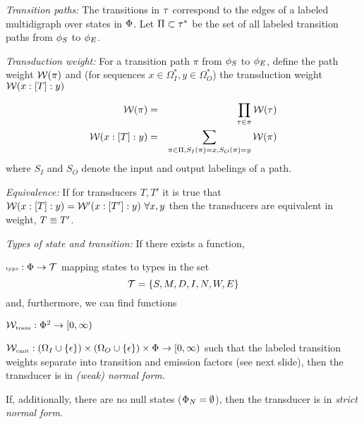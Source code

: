 \documentclass{beamer}
\begin{document}
\begin{frame}{}

{\em Transition paths:}
The transitions in $\tau$ correspond to the edges of a labeled multidigraph over states in $\Phi$.
Let $\Pi \subset \tau^\ast$ be the set of all labeled transition paths from $\phi_S$ to $\phi_E$.

{\em Transduction weight:}
For a transition path $\pi$ from $\phi_S$ to $\phi_E$,
define the path weight ${\cal W}(\pi)$ and
(for sequences $x \in \Omega_I^\ast, y \in \Omega_O^\ast$)
the transduction weight ${\cal W}(x : [T] : y)$

\begin{eqnarray*}
{\cal W}(\pi) & = & \prod_{\tau \in \pi} {\cal W}(\tau) \\
{\cal W}(x : [T] : y) & = & \sum_{\pi \in \Pi, S_I(\pi)=x, S_O(\pi)=y} {\cal W}(\pi)
\end{eqnarray*}
where $S_I$ and $S_O$ denote the input and output labelings of a path.
\end{frame}

\begin{frame}{}

{\em Equivalence:}
If for transducers $T,T'$ it is true that $\wtrans{\weight}{x}{T}{y}=\wtrans{\weight'}{x}{T'}{y}\ \forall x,y$ then the transducers are equivalent in weight, $T \equiv T'$.
\end{frame}

\begin{frame}{}

{\em Types of state and transition:}
If there exists a function,
\itemb
\item $\mbox{\tiny type}:\Phi \to {\cal T}$
\iteme
mapping states to types in the set
\[
{\cal T} = \{S,M,D,I,N,W,E\}
\]
and, furthermore, we can find functions
\itemb
\item ${\cal W}_{\mbox{\tiny trans}}: \Phi^2 \to [0,\infty)$
\item ${\cal W}_{\mbox{\tiny emit}}: (\Omega_{I} \cup \{\epsilon\}) \times (\Omega_{O} \cup \{\epsilon\}) \times \Phi \to [0,\infty)$
\iteme
such that the labeled transition weights separate into transition and emission factors (see next slide),
then the transducer is in {\em (weak) normal form}.

If, additionally, there are no null states ($\Phi_{N} = \emptyset$),
then the transducer is in {\em strict normal form}.

\end{frame}
\end{document}
